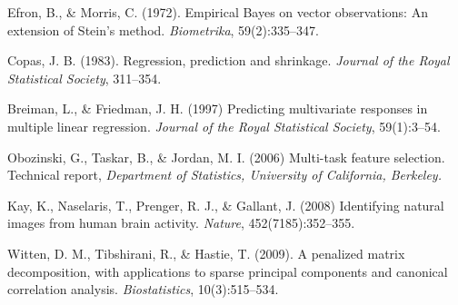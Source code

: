 \documentclass[main]{subfiles}
\begin{document}
\begin{hanglist}[.5cm]
\item Efron, B., \& Morris, C. (1972). Empirical Bayes on vector observations: An extension of Stein's method. {\sl Biometrika}, 59(2):335--347.
\item Copas, J. B. (1983). Regression, prediction and shrinkage. {\sl Journal of the Royal Statistical Society}, 311--354.
\item Breiman, L., \& Friedman, J. H. (1997) Predicting multivariate responses in multiple linear regression. {\sl Journal of the Royal Statistical Society}, 59(1):3--54.
\item Obozinski, G., Taskar, B., \& Jordan, M. I. (2006) Multi-task feature selection. Technical report, {\sl Department of Statistics, University of California, Berkeley.}
\item Kay, K., Naselaris, T., Prenger, R. J., \& Gallant, J. (2008) Identifying natural images from human brain activity. {\sl Nature}, 452(7185):352--355.
\item Witten, D. M., Tibshirani, R., \& Hastie, T. (2009). A penalized matrix decomposition, with applications to sparse principal components and canonical correlation analysis. {\sl Biostatistics}, 10(3):515--534.
\end{hanglist}
\end{document}

